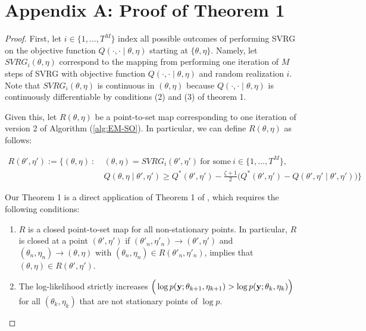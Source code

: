 \section{Appendix A: Proof of Theorem 1}

\begin{proof}

First, let $i \in \{1,\ldots,T^M\}$ index all possible outcomes of performing SVRG on the objective function $Q(\cdot, \cdot \mid \theta, \eta)$ starting at $\{\theta,\eta\}$. Namely, let $SVRG_i(\theta,\eta)$ correspond to the mapping from performing one iteration of $M$ steps of SVRG with objective function $Q(\cdot, \cdot \mid \theta, \eta)$ and random realization $i$. Note that $SVRG_i(\theta,\eta)$ is continuous in $(\theta,\eta)$ because $Q(\cdot, \cdot \mid \theta, \eta)$ is continuously differentiable by conditions (2) and (3) of theorem 1.

Given this, let $R(\theta,\eta)$ be a point-to-set map corresponding to one iteration of version 2 of Algorithm (\ref{alg:EM-SO}). In particular, we can define $R(\theta,\eta)$ as follows:

\begin{align}
    R(\theta',\eta') := \Bigg\{(\theta,\eta) ~ : ~ & (\theta,\eta) = SVRG_i(\theta',\eta') ~ \text{for some} ~ i \in \{1,\ldots,T^M\}, \nonumber \\
    & Q(\theta, \eta \mid \theta', \eta') \geq Q^*(\theta', \eta') - \frac{\zeta + 1}{2} \Big( Q^*(\theta', \eta') - Q(\theta', \eta' \mid \theta', \eta') \Big)\Bigg\}
\end{align}

Our Theorem 1 is a direct application of Theorem 1 of \citet{Wu:1983}, which requires the following conditions:

\begin{enumerate}[label=(\alph*)]
    \item $R$ is a closed point-to-set map for all non-stationary points. In particular, $R$ is closed at a point $(\theta',\eta')$ if $(\theta'_{n},\eta'_{n}) \to (\theta',\eta')$ and $(\theta_{n},\eta_{n}) \to (\theta,\eta)$ with $(\theta_{n},\eta_{n}) \in R(\theta'_{n},\eta'_{n})$, implies that $(\theta,\eta) \in R(\theta',\eta')$. 
    \item The log-likelihood strictly increases $\Big(\log p(\mathbf{y};\theta_{k+1},\eta_{k+1}) > \log p(\mathbf{y};\theta_k,\eta_k)\Big)$ for all $(\theta_k,\eta_k)$ that are not stationary points of $\log p$.
\end{enumerate}


\end{proof}
